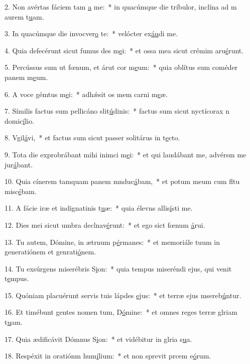 2. Non avértas fáciem tam \uline{a} me:~* in quacúmque die tríbulor, inclína ad m aurem t\uline{u}am.\par 
3. In quacúmque die invocver\uline{o} te:~* velócter ex\uline{áu}di me.\par 
4. Quia defecérunt sicut fumus des m\uline{e}i:~* et ossa mea sicut crémim aru\uline{é}runt.\par 
5. Percússus sum ut fœnum, et árut cor m\uline{e}um:~* quia oblítus sum coméder panem m\uline{e}um.\par 
6. A voce gémtus m\uline{e}i:~* adhǽsit os mem carni m\uline{e}æ.\par 
7. Símilis factus sum pellicáno slit\uline{ú}dinis:~* factus sum sicut nyctícorax n domic\uline{í}lio.\par 
8. Vgil\uline{á}vi,~* et factus sum sicut passer solitárus in t\uline{e}cto.\par 
9. Tota die exprobrábant mihi inimci m\uline{e}i:~* et qui laudábant me, advérsm me jur\uline{á}bant.\par 
10. Quia cínerem tamquam panem mnduc\uline{á}bam,~* et potum meum cum fltu misc\uline{é}bam.\par 
11. A fácie iræ et indignatinis t\uline{u}æ:~* quia élevns allis\uline{í}sti me.\par 
12. Dies mei sicut umbra declnav\uline{é}runt:~* et ego sict fœnum \uline{á}rui.\par 
13. Tu autem, Dómine, in ætrnum p\uline{é}rmanes:~* et memoriále tuum in generatiónem et genrati\uline{ó}nem.\par 
14. Tu exsúrgens miserébris S\uline{i}on:~* quia tempus miseréndi ejus, qui venit t\uline{e}mpus.\par 
15. Quóniam placuérunt servis tuis lápdes \uline{e}jus:~* et terræ ejus msereb\uline{ú}ntur.\par 
16. Et timébunt gentes nomen tum, D\uline{ó}mine:~* et omnes reges terræ glriam t\uline{u}am.\par 
17. Quia ædificávit Dómnus S\uline{i}on:~* et vidébitur in glria s\uline{u}a.\par 
18. Respéxit in oratiónm hum\uline{í}lium:~* et non sprevit prcem e\uline{ó}rum.\par 
